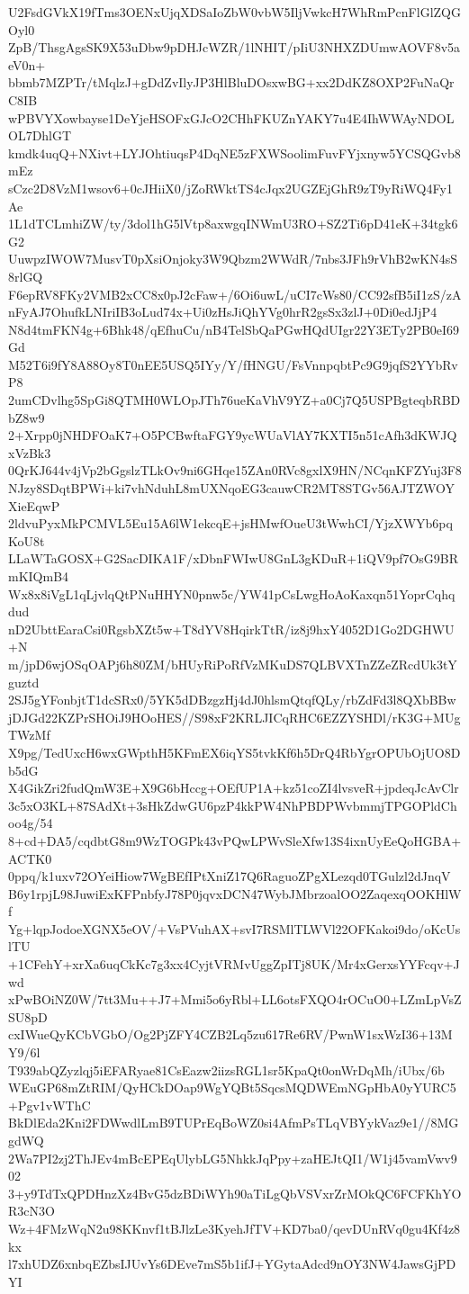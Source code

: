 U2FsdGVkX19fTms3OENxUjqXDSaIoZbW0vbW5IljVwkcH7WhRmPcnFlGlZQGOyl0
ZpB/ThsgAgsSK9X53uDbw9pDHJcWZR/1lNHIT/pIiU3NHXZDUmwAOVF8v5aeV0n+
bbmb7MZPTr/tMqlzJ+gDdZvIlyJP3HlBluDOsxwBG+xx2DdKZ8OXP2FuNaQrC8IB
wPBVYXowbayse1DeYjeHSOFxGJcO2CHhFKUZnYAKY7u4E4IhWWAyNDOLOL7DhlGT
kmdk4uqQ+NXivt+LYJOhtiuqsP4DqNE5zFXWSoolimFuvFYjxnyw5YCSQGvb8mEz
sCzc2D8VzM1wsov6+0cJHiiX0/jZoRWktTS4cJqx2UGZEjGhR9zT9yRiWQ4Fy1Ae
1L1dTCLmhiZW/ty/3dol1hG5lVtp8axwgqINWmU3RO+SZ2Ti6pD41eK+34tgk6G2
UuwpzIWOW7MusvT0pXsiOnjoky3W9Qbzm2WWdR/7nbs3JFh9rVhB2wKN4sS8rlGQ
F6epRV8FKy2VMB2xCC8x0pJ2cFaw+/6Oi6uwL/uCI7cWs80/CC92sfB5iI1zS/zA
nFyAJ7OhufkLNIriIB3oLud74x+Ui0zHsJiQhYVg0hrR2gsSx3zlJ+0Di0edJjP4
N8d4tmFKN4g+6Bhk48/qEfhuCu/nB4TelSbQaPGwHQdUIgr22Y3ETy2PB0eI69Gd
M52T6i9fY8A88Oy8T0nEE5USQ5IYy/Y/fHNGU/FsVnnpqbtPc9G9jqfS2YYbRvP8
2umCDvlhg5SpGi8QTMH0WLOpJTh76ueKaVhV9YZ+a0Cj7Q5USPBgteqbRBDbZ8w9
2+Xrpp0jNHDFOaK7+O5PCBwftaFGY9ycWUaVlAY7KXTI5n51cAfh3dKWJQxVzBk3
0QrKJ644v4jVp2bGgslzTLkOv9ni6GHqe15ZAn0RVc8gxlX9HN/NCqnKFZYuj3F8
NJzy8SDqtBPWi+ki7vhNduhL8mUXNqoEG3cauwCR2MT8STGv56AJTZWOYXieEqwP
2ldvuPyxMkPCMVL5Eu15A6lW1ekcqE+jsHMwfOueU3tWwhCI/YjzXWYb6pqKoU8t
LLaWTaGOSX+G2SacDIKA1F/xDbnFWIwU8GnL3gKDuR+1iQV9pf7OsG9BRmKIQmB4
Wx8x8iVgL1qLjvlqQtPNuHHYN0pnw5c/YW41pCsLwgHoAoKaxqn51YoprCqhqdud
nD2UbttEaraCsi0RgsbXZt5w+T8dYV8HqirkTtR/iz8j9hxY4052D1Go2DGHWU+N
m/jpD6wjOSqOAPj6h80ZM/bHUyRiPoRfVzMKuDS7QLBVXTnZZeZRcdUk3tYguztd
2SJ5gYFonbjtT1dcSRx0/5YK5dDBzgzHj4dJ0hlsmQtqfQLy/rbZdFd3l8QXbBBw
jDJGd22KZPrSHOiJ9HOoHES//S98xF2KRLJICqRHC6EZZYSHDl/rK3G+MUgTWzMf
X9pg/TedUxcH6wxGWpthH5KFmEX6iqYS5tvkKf6h5DrQ4RbYgrOPUbOjUO8Db5dG
X4GikZri2fudQmW3E+X9G6bHccg+OEfUP1A+kz51coZI4lvsveR+jpdeqJcAvClr
3c5xO3KL+87SAdXt+3sHkZdwGU6pzP4kkPW4NhPBDPWvbmmjTPGOPldChoo4g/54
8+cd+DA5/cqdbtG8m9WzTOGPk43vPQwLPWvSleXfw13S4ixnUyEeQoHGBA+ACTK0
0ppq/k1uxv72OYeiHiow7WgBEfIPtXniZ17Q6RaguoZPgXLezqd0TGulzl2dJnqV
B6y1rpjL98JuwiExKFPnbfyJ78P0jqvxDCN47WybJMbrzoalOO2ZaqexqOOKHlWf
Yg+lqpJodoeXGNX5eOV/+VsPVuhAX+svI7RSMlTLWVl22OFKakoi9do/oKcUslTU
+1CFehY+xrXa6uqCkKc7g3xx4CyjtVRMvUggZpITj8UK/Mr4xGerxsYYFcqv+Jwd
xPwBOiNZ0W/7tt3Mu++J7+Mmi5o6yRbl+LL6otsFXQO4rOCuO0+LZmLpVsZSU8pD
cxIWueQyKCbVGbO/Og2PjZFY4CZB2Lq5zu617Re6RV/PwnW1sxWzI36+13MY9/6l
T939abQZyzlqj5iEFARyae81CsEazw2iizsRGL1sr5KpaQt0onWrDqMh/iUbx/6b
WEuGP68mZtRIM/QyHCkDOap9WgYQBt5SqcsMQDWEmNGpHbA0yYURC5+Pgv1vWThC
BkDlEda2Kni2FDWwdlLmB9TUPrEqBoWZ0si4AfmPsTLqVBYykVaz9e1//8MGgdWQ
2Wa7PI2zj2ThJEv4mBcEPEqUlybLG5NhkkJqPpy+zaHEJtQI1/W1j45vamVwv902
3+y9TdTxQPDHnzXz4BvG5dzBDiWYh90aTiLgQbVSVxrZrMOkQC6FCFKhYOR3cN3O
Wz+4FMzWqN2u98KKnvf1tBJlzLe3KyehJfTV+KD7ba0/qevDUnRVq0gu4Kf4z8kx
l7xhUDZ6xnbqEZbsIJUvYs6DEve7mS5b1ifJ+YGytaAdcd9nOY3NW4JawsGjPDYI
